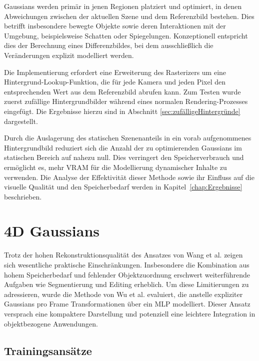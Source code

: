 Gaussians werden primär in jenen Regionen platziert und optimiert, in denen Abweichungen zwischen der aktuellen Szene und dem Referenzbild bestehen. 
Dies betrifft insbesondere bewegte Objekte sowie deren Interaktionen mit der Umgebung, beispielsweise Schatten oder Spiegelungen. 
Konzeptionell entspricht dies der Berechnung eines Differenzbildes, bei dem ausschließlich die Veränderungen explizit modelliert werden.

Die Implementierung erfordert eine Erweiterung des Rasterizers um eine Hintergrund-Lookup-Funktion, die für jede Kamera und jeden Pixel den entsprechenden Wert aus dem Referenzbild abrufen kann. 
Zum Testen wurde zuerst zufällige Hintergrundbilder während eines normalen Rendering-Prozesses eingefügt.
Die Ergebnisse hierzu sind in Abschnitt \ref{sec:zufälligeHintergründe} dargestellt.

Durch die Auslagerung des statischen Szenenanteils in ein vorab aufgenommenes Hintergrundbild reduziert sich die Anzahl der zu optimierenden Gaussians im statischen Bereich auf nahezu null. 
Dies verringert den Speicherverbrauch und ermöglicht es, mehr VRAM für die Modellierung dynamischer Inhalte zu verwenden. 
Die Analyse der Effektivität dieser Methode sowie ihr Einfluss auf die visuelle Qualität und den Speicherbedarf werden in Kapitel~\ref{chap:Ergebnisse} beschrieben.









\section{4D Gaussians}

Trotz der hohen Rekonstruktionsqualität des Ansatzes von Wang et al. zeigen sich  wesentliche praktische Einschränkungen.
Insbesondere die Kombination aus hohem Speicherbedarf und fehlender Objektzuordnung erschwert weiterführende Aufgaben wie Segmentierung und Editing erheblich. Um diese Limitierungen zu adressieren, wurde die Methode von Wu et al. evaluiert, die anstelle expliziter Gaussians pro Frame Transformationen über ein MLP modelliert. Dieser Ansatz versprach eine kompaktere Darstellung und potenziell eine leichtere Integration in objektbezogene Anwendungen.
 
\subsection{Trainingsansätze}

